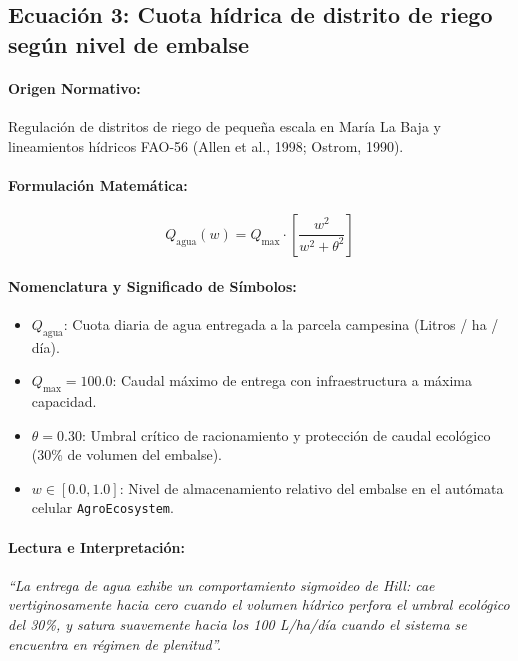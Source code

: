 \documentclass[11pt,a4paper]{article}
\begin{document}
\subsection{Ecuaci\'on 3: Cuota h\'idrica de distrito de riego seg\'un nivel de embalse}

\paragraph{Origen Normativo:} Regulaci\'on de distritos de riego de peque\~na escala en Mar\'ia La Baja y lineamientos h\'idricos FAO-56 (Allen et al., 1998; Ostrom, 1990).

\paragraph{Formulaci\'on Matem\'atica:}
\begin{equation}
    Q_{\text{agua}}(w) = Q_{\text{max}} \cdot \left[\frac{w^2}{w^2 + \theta^2}\right]
\end{equation}

\paragraph{Nomenclatura y Significado de S\'imbolos:}
\begin{itemize}[leftmargin=*]
    \item $Q_{\text{agua}}$: Cuota diaria de agua entregada a la parcela campesina (Litros / ha / d\'ia).
    \item $Q_{\text{max}} = 100.0$: Caudal m\'aximo de entrega con infraestructura a m\'axima capacidad.
    \item $\theta = 0.30$: Umbral cr\'itico de racionamiento y protecci\'on de caudal ecol\'ogico (30\% de volumen del embalse).
    \item $w \in [0.0, 1.0]$: Nivel de almacenamiento relativo del embalse en el aut\'omata celular \texttt{AgroEcosystem}.
\end{itemize}

\paragraph{Lectura e Interpretaci\'on:} \textit{``La entrega de agua exhibe un comportamiento sigmoideo de Hill: cae vertiginosamente hacia cero cuando el volumen h\'idrico perfora el umbral ecol\'ogico del 30\%, y satura suavemente hacia los 100 L/ha/d\'ia cuando el sistema se encuentra en r\'egimen de plenitud''.}
\end{document}
